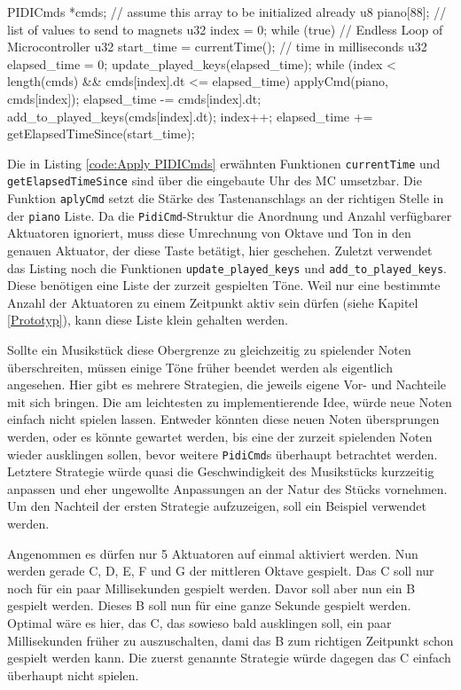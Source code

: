 \begin{UnbrokenCodePage}[style=CStyle, caption={Nutzung der \lstinline{PidiCmd}-Struktur}, label={code:Apply PIDICmds}]
PIDICmds *cmds; // assume this array to be initialized already
u8  piano[88];  // list of values to send to magnets
u32 index = 0;
while (true) {  // Endless Loop of Microcontroller
    u32 start_time   = currentTime(); // time in milliseconds
    u32 elapsed_time = 0;
    update_played_keys(elapsed_time);
    while (index < length(cmds) && cmds[index].dt <= elapsed_time) {
        applyCmd(piano, cmds[index]);
        elapsed_time -= cmds[index].dt;
        add_to_played_keys(cmds[index].dt);
        index++;
    }
    elapsed_time += getElapsedTimeSince(start_time);
}
\end{UnbrokenCodePage}

Die in Listing \ref{code:Apply PIDICmds} erwähnten Funktionen \lstinline{currentTime} und \lstinline{getElapsedTimeSince} sind über die eingebaute Uhr des \ac{MC} umsetzbar.
Die Funktion \lstinline{aplyCmd} setzt die Stärke des Tastenanschlags an der richtigen Stelle in der \lstinline{piano} Liste.
Da die \lstinline{PidiCmd}-Struktur die Anordnung und Anzahl verfügbarer Aktuatoren ignoriert, muss diese Umrechnung von Oktave und Ton in den genauen Aktuator, der diese Taste betätigt, hier geschehen.
Zuletzt verwendet das Listing noch die Funktionen \lstinline{update_played_keys} und \lstinline{add_to_played_keys}.
Diese benötigen eine Liste der zurzeit gespielten Töne.
Weil nur eine bestimmte Anzahl der Aktuatoren zu einem Zeitpunkt aktiv sein dürfen (siehe Kapitel \ref{Prototyp}), kann diese Liste klein gehalten werden.

Sollte ein Musikstück diese Obergrenze zu gleichzeitig zu spielender Noten überschreiten, müssen einige Töne früher beendet werden als eigentlich angesehen.
Hier gibt es mehrere Strategien, die jeweils eigene Vor- und Nachteile mit sich bringen.
Die am leichtesten zu implementierende Idee, würde neue Noten einfach nicht spielen lassen.
Entweder könnten diese neuen Noten übersprungen werden, oder es könnte gewartet werden, bis eine der zurzeit spielenden Noten wieder ausklingen sollen, bevor weitere \lstinline{PidiCmd}s überhaupt betrachtet werden.
Letztere Strategie würde quasi die Geschwindigkeit des Musikstücks kurzzeitig anpassen und eher ungewollte Anpassungen an der Natur des Stücks vornehmen.
Um den Nachteil der ersten Strategie aufzuzeigen, soll ein Beispiel verwendet werden.

Angenommen es dürfen nur 5 Aktuatoren auf einmal aktiviert werden.
Nun werden gerade C, D, E, F und G der mittleren Oktave gespielt.
Das C soll nur noch für ein paar Millisekunden gespielt werden.
Davor soll aber nun ein B gespielt werden.
Dieses B soll nun für eine ganze Sekunde gespielt werden.
Optimal wäre es hier, das C, das sowieso bald ausklingen soll, ein paar Millisekunden früher zu auszuschalten, dami das B zum richtigen Zeitpunkt schon gespielt werden kann.
Die zuerst genannte Strategie würde dagegen das C einfach überhaupt nicht spielen.

